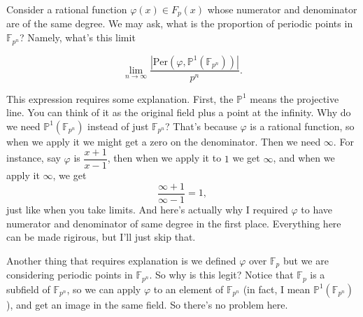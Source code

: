 \documentclass{amsart}
\theoremstyle{definition}
\theoremstyle{remark}
\renewcommand{\P}{\mathbb{P}}
\newcommand{\F}{\mathbb{F}}
\renewcommand{\phi}{\varphi}
\begin{document}
Consider a rational function $\phi(x) \in F_p(x)$ whose numerator and
denominator are of the same degree. We may ask, what is the
proportion of periodic points in $\F_{p^n}$? Namely, what's this limit

\[
\lim_{n \to \infty} \frac{|\mathrm{Per}(\phi, \P^1(\F_{p^n}))|}{p^n}.
\]

This expression requires some explanation. First, the $\P^1$ means the
projective line. You can think of it as the original field plus a
point at the infinity. Why do we need $\P^1(\F_{p^n})$ instead of just
$\F_{p^n}$? That's because $\phi$ is a rational function, so when we
apply it we might get a zero on the denominator. Then we need
$\infty$. For instance, say $\phi$ is $\dfrac{x+1}{x-1}$, then when we
apply it to $1$ we get $\infty$, and when we apply it $\infty$, we get
\[
\frac{\infty + 1}{\infty - 1} = 1,
\]
just like when you take limits. And here's actually why I required $\phi$ to
have numerator and denominator of same degree in the first
place. Everything here can be made rigirous, but I'll just skip that.

Another thing that requires explanation is we defined $\phi$ over
$\F_p$ but we are considering periodic points in $\F_{p^n}$. So why is
this legit?  Notice that $\F_p$ is a subfield of $\F_{p^n}$, so we can
apply $\phi$ to an element of $\F_{p^n}$ (in fact, I mean
$\P^1(\F_{p^n})$), and get an image in the same field. So there's no
problem here.
\end{document}
